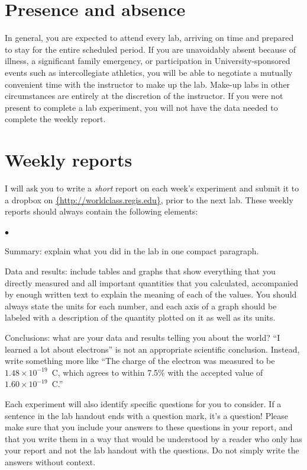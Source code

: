 \documentclass[11pt]{article}
\newcommand{\squishlist}{
   \begin{list}{$\bullet$}
    { \setlength{\itemsep}{0pt}      \setlength{\parsep}{3pt}
      \setlength{\topsep}{3pt}       \setlength{\partopsep}{0pt}
      \setlength{\leftmargin}{1.5em} \setlength{\labelwidth}{1em}
      \setlength{\labelsep}{0.5em} } }
\newcommand{\squishend}{
    \end{list}  }
\begin{document}
\section{Presence and absence}

In general, you are expected to attend every lab, arriving on time and prepared to stay for the entire scheduled period.
If you are unavoidably absent because of illness, a significant family emergency, or participation in University-sponsored
events such as intercollegiate athletics, you will be able to negotiate a mutually convenient time with the instructor to make up 
the lab.  Make-up labs in other circumstances are entirely at the discretion of the instructor.  If you were not present to
complete a lab experiment, you will not have the data needed to complete the weekly report.

\section{Weekly reports}

I will ask you to write a {\em short} report on each week's experiment and 
submit it to a dropbox on \url{{http://worldclass.regis.edu}},
prior to the next lab.
These weekly reports should always contain the following elements:
\squishlist
\item Summary: explain what you did in the lab in one compact paragraph.
\item Data and results: include tables and graphs that show everything 
  that you directly measured and all important quantities that you calculated,
  accompanied by enough written text to explain the meaning of each of the 
  values.  You should always state the units for each number, and each axis 
  of a graph should be labeled with a description of the quantity plotted on 
  it as well as its units.
\item Conclusions: what are your data and results telling you about the world?
  ``I learned a lot about electrons'' is not an appropriate scientific conclusion.  
  Instead, write something more like ``The charge of the electron was measured to be $1.48 \times 10^{-19}$~C, which agrees to within 7.5\% with the accepted value of $1.60 \times 10^{-19}$~C.''
\squishend

Each experiment will also identify specific questions for you to consider.  
If a sentence in the lab handout ends with a question mark, it's a question!
Please make sure that you include your answers to these questions in your 
report, and that you write them in a way that would be understood by a reader 
who only has your report and not the lab handout with the questions.
Do not simply write the answers without context.
\end{document}
